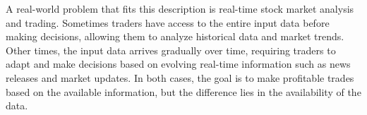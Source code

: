 A real-world problem that fits this description is real-time stock market analysis and trading.
Sometimes traders have access to the entire input data before making decisions, allowing them to analyze historical data and market trends.
Other times, the input data arrives gradually over time, requiring traders to adapt and make decisions based on evolving real-time information such as news releases and market updates.
In both cases, the goal is to make profitable trades based on the available information, but the difference lies in the availability of the data.

